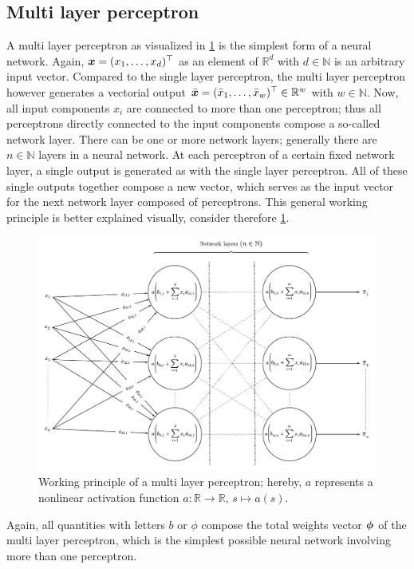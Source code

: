 \documentclass[a4paper,12pt]{report}
\begin{document}
\subsection{Multi layer perceptron}
A multi layer perceptron as visualized in \cref{fig:MLP} is the simplest form of a neural network. Again, $\bm{x} = (x_1, \dots, x_d)^\top$ as an element of $\mathbb{R}^d$ with $d \in \mathbb{N}$ is an arbitrary input vector. Compared to the single layer perceptron, the multi layer perceptron however generates a vectorial output $\bar{\bm{x}} = (\bar{x}_1,\dots,\bar{x}_w)^\top \in \mathbb{R}^w$ with $w \in \mathbb{N}$. Now, all input components $x_i$ are connected to more than one perceptron; thus all perceptrons directly connected to the input components compose a so-called network layer. There can be one or more network layers; generally there are $n\in \mathbb{N}$ layers in a neural network. At each perceptron of a certain fixed network layer, a single output is generated as with the single layer perceptron. All of these single outputs together compose a new vector, which serves as the input vector for the next network layer composed of perceptrons. This general working principle is better explained visually, consider therefore \cref{fig:MLP}.
\begin{figure}[h!]
\centering
\includegraphics[width=\textwidth]{figures/MLP.pdf}
\caption{Working principle of a multi layer perceptron; hereby, $a$ represents a nonlinear activation function $a :\mathbb{R}\rightarrow \mathbb{R},\, s\mapsto a(s)$.}
\label{fig:MLP}
\end{figure}
Again, all quantities with letters $b$ or $\phi$ compose the total weights vector $\bm{\phi}$ of the multi layer perceptron, which is the simplest possible neural network involving more than one perceptron.
\end{document}
